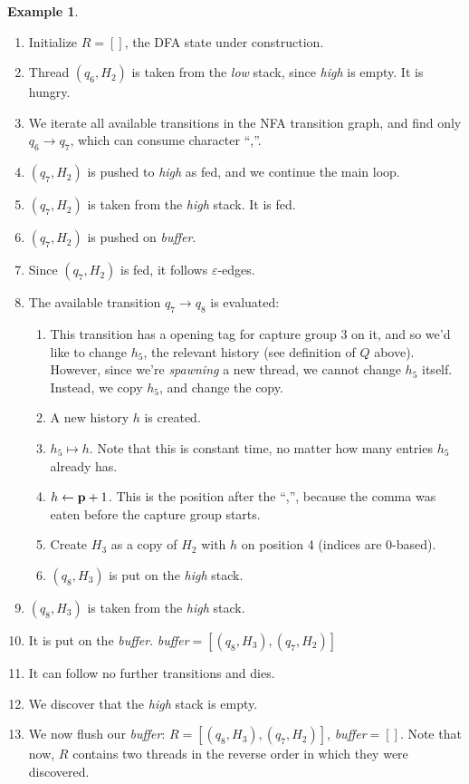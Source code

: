 \documentclass[english]{sigplanconf}
\theoremstyle{definition}
\newtheorem{example}{Example}[section]
\begin{document}
\begin{example}
\begin{enumerate}
\item Initialize $R=[]$, the DFA state under construction.
\item Thread $(q_6,H_2)$ is taken from the \emph{low} stack, since \emph{high} is empty. It is hungry.
\item We iterate all available transitions in the NFA transition graph, and find only $q_6\rightarrow q_7$, which can consume character ``,''.
\item $(q_7, H_2)$ is pushed to \emph{high} as fed, and we continue the main loop.
\item $(q_7, H_2)$ is taken from the \emph{high} stack. It is fed.
\item $(q_7, H_2)$ is pushed on \emph{buffer}.
\item Since $(q_7, H_2)$ is fed, it follows $\varepsilon$-edges.
\item The available transition $q_7\rightarrow q_8$ is evaluated:\begin{enumerate}
	\item 	This transition has a opening tag for capture group 3 on it, and so we'd like to change $h_5$, 
		the relevant history (see definition of $Q$ above). However, since we're \emph{spawning} a new thread, we cannot change $h_5$ itself.
		Instead, we copy $h_5$, and change the copy.
	\item	A new history $h$ is created.
	\item 	$h_5 \mapsto h$. Note that this is constant time, no matter how many entries $h_5$ already has.
	\item 	$h\leftarrow\mathbf{\mathbf{p}}+1$. This is the position after the ``,'', because the comma was eaten before the capture
			group starts.
	\item	Create $H_3$ as a copy of $H_2$ with $h$ on position 4 (indices are 0-based).
	\item $(q_8, H_3)$ is put on the \emph{high} stack.
\end{enumerate}
\item $(q_8, H_3)$ is taken from the \emph{high} stack.
\item It is put on the \emph{buffer}. \emph{buffer}$=[(q_8, H_3), (q_7, H_2)]$
\item It can follow no further transitions and dies.
\item We discover that the \emph{high} stack is empty.
\item We now flush our \emph{buffer}: $R=[(q_8, H_3), (q_7, H_2)]$, \emph{buffer}$=[]$.
	Note that now, $R$ contains two threads in the reverse order in which they were discovered.

\end{enumerate}
\end{example}
\end{document}
